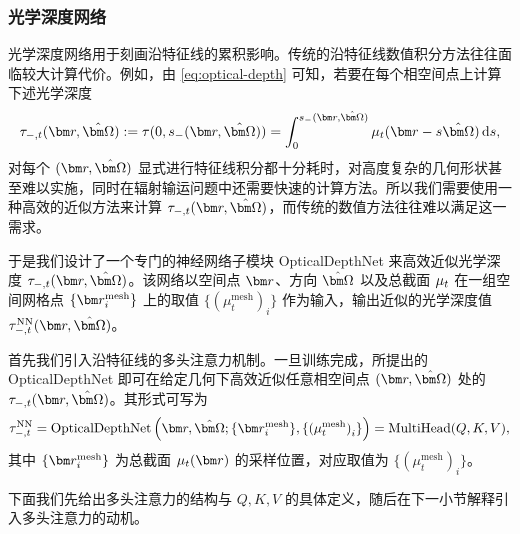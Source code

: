 


\subsubsection{光学深度网络}
光学深度网络用于刻画沿特征线的累积影响。传统的沿特征线数值积分方法往往面临较大计算代价。例如，由 \eqref{eq:optical-depth} 可知，若要在每个相空间点上计算下述光学深度
\begin{equation}
    \tau_{-,t}(\br,\bOmega):=\tau(0, s_-(\br, \bOmega))=\int^{s_-(\br, \bOmega)}_{0} \mut(\br-s\bOmega) \diff{s},
\end{equation}
对每个 $(\br,\bOmega)$ 显式进行特征线积分都十分耗时，对高度复杂的几何形状甚至难以实施，同时在辐射输运问题中还需要快速的计算方法。所以我们需要使用一种高效的近似方法来计算 $\tau_{-,t}(\br,\bOmega)$，而传统的数值方法往往难以满足这一需求。

于是我们设计了一个专门的神经网络子模块 OpticalDepthNet 来高效近似光学深度 $\tau_{-,t}(\br,\bOmega)$。该网络以空间点 $\br$、方向 $\bOmega$ 以及总截面 $\mu_t$ 在一组空间网格点 $\{\br^{\text{mesh}}_i\}$ 上的取值 $\{{(\mu_t^{\text{mesh}})}_i\}$ 作为输入，输出近似的光学深度值 $\tau_{-,t}^{\text{NN}}(\br,\bOmega)$。

首先我们引入沿特征线的多头注意力机制。一旦训练完成，所提出的 OpticalDepthNet 即可在给定几何下高效近似任意相空间点 $(\br,\bOmega)$ 处的 $\tau_{-,t}(\br,\bOmega)$。其形式可写为
\begin{equation}\label{eq:optical-depth-net}
    \tau_{-,t}^{\text{NN}} = \text{OpticalDepthNet}\left(\br,\bOmega; \{\br^{\text{mesh}}_i\}, \{{(\mu_t^{\text{mesh}})}_i\}\right) = \text{MultiHead}(Q, K, V),
\end{equation}
其中 $\{\br^{\text{mesh}}_i\}$ 为总截面 $\mu_t(\br)$ 的采样位置，对应取值为 $\{{(\mu_t^{\text{mesh}})}_i\}$。

下面我们先给出多头注意力的结构与 $Q,K,V$ 的具体定义，随后在下一小节解释引入多头注意力的动机。

